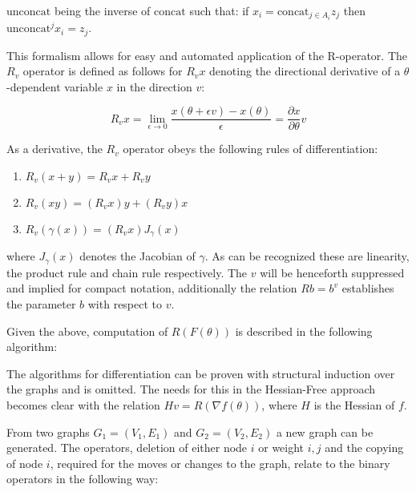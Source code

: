 $\text{unconcat}$ being the inverse of $\text{concat}$ such that: if $x_i = \text{concat}_{j\in A_i} z_j$ then $\text{unconcat}^j x_i = z_j$. 

This formalism allows for easy and automated application of the R-operator. The $R_v$ operator is defined as follows for $R_vx $ denoting the directional derivative of a $\theta$-dependent variable $x$ in the direction $v$:

\[R_vx = \lim_{\epsilon\to 0} \frac{x(\theta + \epsilon v) - x(\theta)}{\epsilon} = \frac{\partial x}{\partial\theta}v\]

As a derivative, the $R_v$ operator obeys the following rules of differentiation:

\begin{enumerate}
    \item $R_v(x+y) = R_vx + R_vy$
    \item $ R_v(xy) = (R_vx)y + (R_vy)x $
    \item $R_v(\gamma(x)) = (R_vx) J_{\gamma}(x)$
\end{enumerate}

where $J_\gamma(x)$ denotes the Jacobian of $\gamma$. As can be recognized these are linearity, the product rule and chain rule respectively. The $v$ will be henceforth suppressed and implied for compact notation, additionally the relation $Rb = b^v$ establishes the parameter $b$ with respect to $v$.

Given the above, computation of $R(F(\theta))$ is described in the following algorithm:

\begin{algorithmic}[1]
    \EndFor
\end{algorithmic}

The algorithms for differentiation can be proven with structural induction over the graphs and is omitted. The needs for this in the Hessian-Free approach becomes clear with the relation $Hv = R(\nabla f(\theta))$, where $H$ is the Hessian of $f$. 

From two graphs $G_1 = (V_1,E_1)$ and $G_2 = (V_2, E_2)$ a new graph can be generated. The operators, deletion of either node $i$ or weight $i,j$ and the copying of node $i$, required for the moves or changes to the graph, relate to the binary operators in the following way:

